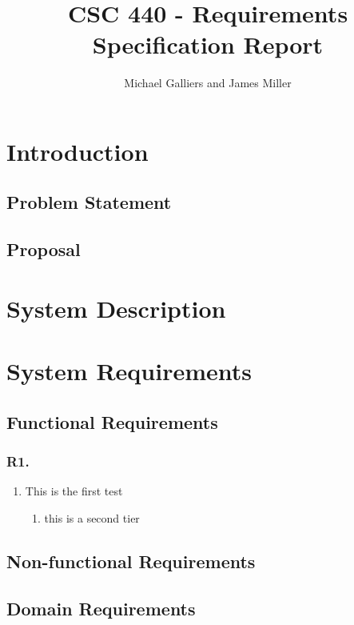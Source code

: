 \documentclass[12pt]{article}
\author{Michael Galliers and James Miller}
\title{CSC 440 - Requirements Specification Report}
\begin{document}
\begin{titlepage}
\maketitle
\end{titlepage}

\newpage
    \tableofcontents
\newpage

\section{Introduction}
\subsection{Problem Statement}

\subsection{Proposal}

\section{System Description}

\section{System Requirements}
\subsection{Functional Requirements}
\subsubsection{R1. }
\begin{enumerate}
    \item This is the first test
    \begin{enumerate}
        \item this is a second tier
    \end{enumerate}
\end{enumerate}
\subsection{Non-functional Requirements}

\subsection{Domain Requirements}
\end{document}
